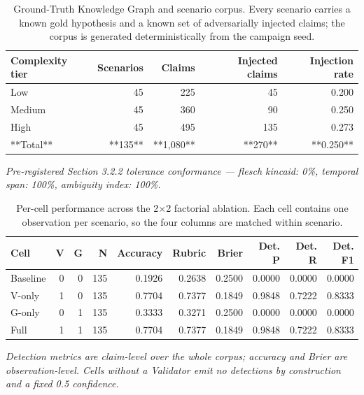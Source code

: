 \begin{table}[htbp]
\centering
\small
\caption{Ground-Truth Knowledge Graph and scenario corpus. Every scenario carries a known gold hypothesis and a known set of adversarially injected claims; the corpus is generated deterministically from the campaign seed.}
\label{tab:gmais-1}
\begin{tabular}{lrrrr}
\toprule
Complexity tier & Scenarios & Claims & Injected claims & Injection rate \\
\midrule
Low & 45 & 225 & 45 & 0.200 \\
Medium & 45 & 360 & 90 & 0.250 \\
High & 45 & 495 & 135 & 0.273 \\
**Total** & **135** & **1,080** & **270** & **0.250** \\
\bottomrule
\end{tabular}
\par\vspace{2pt}\footnotesize\emph{Pre-registered Section 3.2.2 tolerance conformance --- flesch kincaid: 0\%, temporal span: 100\%, ambiguity index: 100\%.}
\end{table}


\begin{table}[htbp]
\centering
\small
\caption{Per-cell performance across the 2$\times$2 factorial ablation. Each cell contains one observation per scenario, so the four columns are matched within scenario.}
\label{tab:gmais-2}
\begin{tabular}{lrrrrrrrrr}
\toprule
Cell & V & G & N & Accuracy & Rubric & Brier & Det. P & Det. R & Det. F1 \\
\midrule
Baseline & 0 & 0 & 135 & 0.1926 & 0.2638 & 0.2500 & 0.0000 & 0.0000 & 0.0000 \\
V-only & 1 & 0 & 135 & 0.7704 & 0.7377 & 0.1849 & 0.9848 & 0.7222 & 0.8333 \\
G-only & 0 & 1 & 135 & 0.3333 & 0.3271 & 0.2500 & 0.0000 & 0.0000 & 0.0000 \\
Full & 1 & 1 & 135 & 0.7704 & 0.7377 & 0.1849 & 0.9848 & 0.7222 & 0.8333 \\
\bottomrule
\end{tabular}
\par\vspace{2pt}\footnotesize\emph{Detection metrics are claim-level over the whole corpus; accuracy and Brier are observation-level. Cells without a Validator emit no detections by construction and a fixed 0.5 confidence.}
\end{table}


